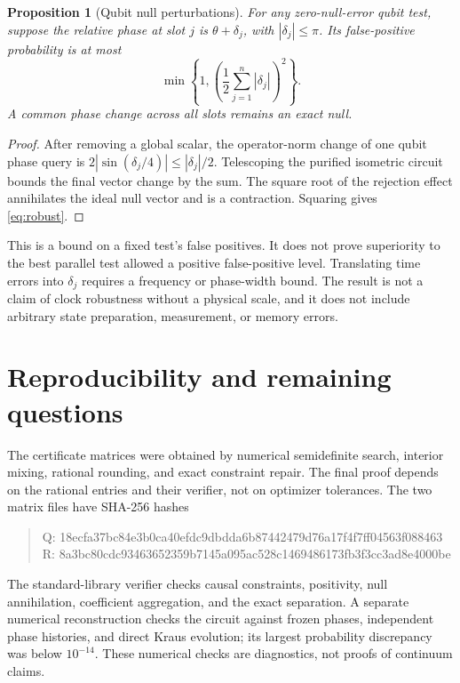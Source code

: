\documentclass[11pt,a4paper]{article}
\newtheorem{proposition}[theorem]{Proposition}
\theoremstyle{remark}
\begin{document}
\begin{proposition}[Qubit null perturbations]\label{prop:robust}
For any zero-null-error qubit test, suppose the relative phase at slot
\(j\) is \(\theta+\delta_j\), with \(|\delta_j|\leq\pi\).
Its false-positive probability is at most
\begin{equation}\label{eq:robust}
 \min\left\{1,\left(\frac12\sum_{j=1}^n|\delta_j|\right)^2\right\}.
\end{equation}
A common phase change across all slots remains an exact null.
\end{proposition}
\begin{proof}
After removing a global scalar, the operator-norm change of one qubit
phase query is \(2|\sin(\delta_j/4)|\leq|\delta_j|/2\).
Telescoping the purified isometric circuit bounds the final vector
change by the sum. The square root of the rejection effect annihilates
the ideal null vector and is a contraction. Squaring gives
\eqref{eq:robust}.
\end{proof}

This is a bound on a fixed test's false positives. It does not prove
superiority to the best parallel test allowed a positive false-positive
level. Translating time errors into \(\delta_j\) requires a frequency
or phase-width bound. The result is not a claim of clock robustness
without a physical scale, and it does not include arbitrary state
preparation, measurement, or memory errors.

\section{Reproducibility and remaining questions}

The certificate matrices were obtained by numerical semidefinite search,
interior mixing, rational rounding, and exact constraint repair.
The final proof depends on the rational entries and their verifier,
not on optimizer tolerances. The two matrix files have SHA-256 hashes
\begin{quote}\small\ttfamily
Q: 18ecfa37bc84e3b0ca40efdc9dbdda6b87442479d76a17f4f7ff04563f088463\\
R: 8a3bc80cdc93463652359b7145a095ac528c1469486173fb3f3cc3ad8e4000be
\end{quote}
The standard-library verifier checks causal constraints, positivity,
null annihilation, coefficient aggregation, and the exact separation.
A separate numerical reconstruction checks the circuit against frozen
phases, independent phase histories, and direct Kraus evolution; its
largest probability discrepancy was below \(10^{-14}\).
These numerical checks are diagnostics, not proofs of continuum claims.
\end{document}
